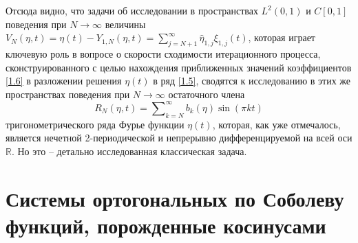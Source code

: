 \documentclass{article}
\numberwithin{equation}{section}
\theoremstyle{plain}
\theoremstyle{definition}
\begin{document}
\begin{fulltext}
\begin{equation*}
 \end{equation*}
Отсюда видно, что задачи об исследовании в пространствах $L^2(0,1)$ и $C[0,1]$ поведения при $N\to\infty$  величины $ V_N(\eta,t)= \eta(t)-Y_{1,N}(\eta,t)=\sum_{j=N+1}^\infty \widehat{\eta}_{1,j}\xi_{1,j}(t)$,  которая играет ключевую роль в вопросе о скорости сходимости итерационного процесса, сконструированного с целью нахождения приближенных значений коэффициентов \eqref{1.6} в разложении решения $\eta(t)$ в ряд \eqref{1.5},       сводятся  к исследованию в этих же пространствах поведения при $N\to\infty$ остаточного члена
\begin{equation*}
  R_N(\eta,t)= \sum\nolimits_{k=N}^\infty b_k(\eta)\sin(\pi kt)
\end{equation*}
тригонометрического ряда Фурье  функции $\eta(t)$, которая, как уже отмечалось, является нечетной 2-периодической и непрерывно дифференцируемой на всей оси $\mathbb{R}$. Но это -- детально исследованная классическая задача.

\section{Системы ортогональных по Соболеву функций, порожденные косинусами}\label{s2}


\end{fulltext}
\end{document}
